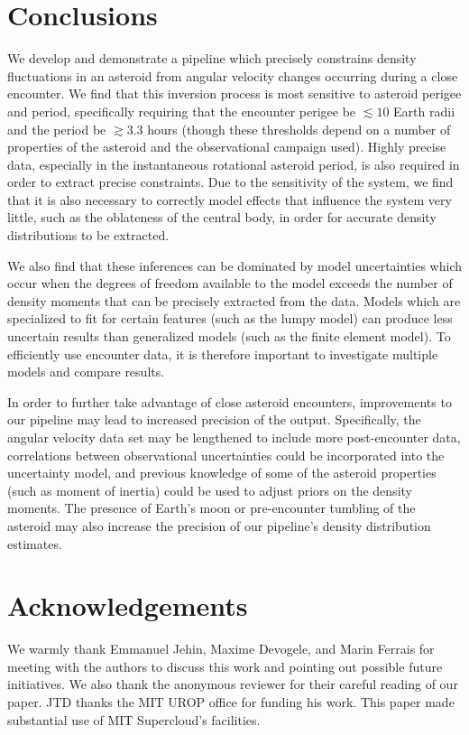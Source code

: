 \documentclass[fleqn,usenatbib]{mnras}
\begin{document}
\section{Conclusions}

We develop and demonstrate a pipeline which precisely constrains density fluctuations in an asteroid from angular velocity changes occurring during a close encounter. We find that this inversion process is most sensitive to asteroid perigee and period, specifically requiring that the encounter perigee be $\lesssim 10$ Earth radii and the period be $\gtrsim 3.3$ hours (though these thresholds depend on a number of properties of the asteroid and the observational campaign used). Highly precise data, especially in the instantaneous rotational asteroid period, is also required in order to extract precise constraints. Due to the sensitivity of the system, we find that it is also necessary to correctly model effects that influence the system very little, such as the oblateness of the central body, in order for accurate density distributions to be extracted.

We also find that these inferences can be dominated by model uncertainties which occur when the degrees of freedom available to the model exceeds the number of density moments that can be precisely extracted from the data. Models which are specialized to fit for certain features (such as the lumpy model) can produce less uncertain results than generalized models (such as the finite element model). To efficiently use encounter data, it is therefore important to investigate multiple models and compare results.

In order to further take advantage of close asteroid encounters, improvements to our pipeline may lead to increased precision of the output. Specifically, the angular velocity data set may be lengthened to include more post-encounter data, correlations between observational uncertainties could be incorporated into the uncertainty model, and previous knowledge of some of the asteroid properties (such as moment of inertia) could be used to adjust priors on the density moments. The presence of Earth's moon or pre-encounter tumbling of the asteroid may also increase the precision of our pipeline's density distribution estimates.


\section*{Acknowledgements}

We warmly thank Emmanuel Jehin, Maxime Devogele, and Marin Ferrais for meeting with the authors to discuss this work and pointing out possible future initiatives. We also thank the anonymous reviewer for their careful reading of our paper. JTD thanks the MIT UROP office for funding his work. This paper made substantial use of MIT Supercloud's facilities.
\end{document}
